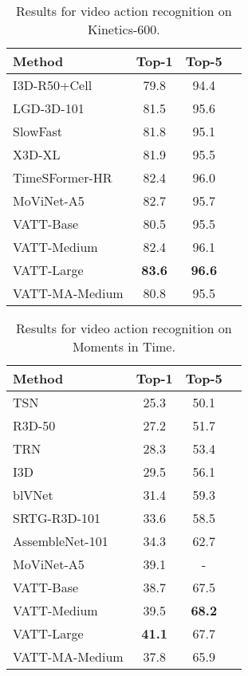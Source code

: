 \documentclass[10pt,twocolumn,letterpaper]{article}
\newcommand{\ours}{VATT\xspace}
\begin{document}
 \begin{table}[h!]
    \small
    \centering
    \begin{tabular}{@{}lccc@{}}
    \toprule
        \sc Method & \sc Top-1 & \sc Top-5 \\
    \midrule
    I3D-R50+Cell~\cite{wang2020attentionnas} & 79.8 & 94.4\\
    LGD-3D-101~\cite{lgdnet} & 81.5 & 95.6\\
    SlowFast~\cite{slowfast} & 81.8 & 95.1\\
    X3D-XL~\cite{feichtenhofer2020x3d} & 81.9 & 95.5\\
    TimeSFormer-HR~\cite{bertasius2021space} & 82.4 & 96.0\\
    MoViNet-A5~\cite{kondratyuk2021movinets} & 82.7 & 95.7 \\
\midrule
    \ours-Base & 80.5 & 95.5 \\
    \ours-Medium & 82.4 & 96.1 \\
    \ours-Large & \textbf{83.6} & \textbf{96.6} \\
    \midrule
    \ours-MA-Medium & 80.8 & 95.5 \\
    \bottomrule
    \end{tabular}
    \vspace{2mm}
    \caption{Results for video action recognition on Kinetics-600.}
    \label{table:video-classification-k600}
    \vspace{-2mm}
\end{table} \begin{table}[h!]
    \small
    \centering
    \begin{tabular}{@{}lccc@{}}
    \toprule
        \sc Method & \sc Top-1 & \sc Top-5 \\
    \midrule
    TSN~\cite{wang2016temporal} & 25.3 & 50.1\\
    R3D-50~\cite{ryoo2019assemblenet} & 27.2 & 51.7\\
    TRN~\cite{zhou2018temporal} & 28.3 & 53.4\\
    I3D~\cite{carreira2017quo} & 29.5 & 56.1\\
    blVNet~\cite{fan2019more} & 31.4 & 59.3\\
    SRTG-R3D-101\cite{stergiou2021learn} & 33.6 & 58.5\\
    AssembleNet-101~\cite{ryoo2019assemblenet} & 34.3 & 62.7\\
MoViNet-A5~\cite{kondratyuk2021movinets} & 39.1 & - \\
    \midrule
    \ours-Base & 38.7 & 67.5 \\
    \ours-Medium & 39.5 & \textbf{68.2} \\
    \ours-Large & \textbf{41.1} & 67.7 \\
    \midrule
    \ours-MA-Medium & 37.8 & 65.9 \\
    \bottomrule
    \end{tabular}
    \vspace{2mm}
    \caption{Results for video action recognition on Moments in Time.}
    \label{table:video-classification-mit}
    \vspace{-2mm}
\end{table} 
\end{document}
